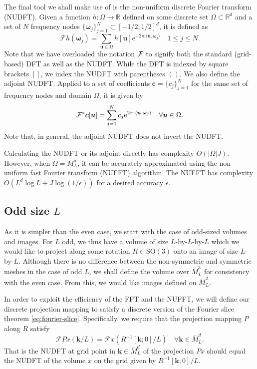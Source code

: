 \documentclass{article}
\newcommand{\euler}{\mathrm{e}}
\newcommand{\imunit}{\mathrm{i}}
\newcommand{\Real}{\mathbb R}
\newcommand{\SO}{\mathrm{SO}}
\newcommand{\meshu}{M}
\newcommand{\meshc}{\overline{M}}
\newcommand{\vol}{x}
\newcommand{\proj}{P}
\newcommand{\vu}{\boldsymbol{u}}
\newcommand{\vomega}{\boldsymbol{\omega}}
\newcommand{\vk}{\boldsymbol{k}}
\newcommand{\vc}{\boldsymbol{c}}
\newcommand{\rot}{R}
\newcommand{\fourier}[1]{\mathcal{F}#1}
\begin{document}
The final tool we shall make use of is the non-uniform discrete Fourier transform (NUDFT).
Given a function $h: \Omega \rightarrow \Real$ defined on some discrete set $\Omega \subset \Real^d$ and a set of $N$ frequency nodes $\{\vomega_j\}_{j=1}^N \subset [-1/2, 1/2]^d$, it is defined as
\begin{equation}
	\fourier{h}(\vomega_j) = \sum_{\vu \in \Omega} h[\vu] \euler^{-2\pi\imunit \langle \vu, \vomega_j \rangle} \quad 1 \le j \le N\mbox{.}
\end{equation}
Note that we have overloaded the notation $\fourier$ to signify both the standard (grid-based) DFT as well as the NUDFT.
While the DFT is indexed by square brackets $[]$, we index the NUDFT with parentheses $()$.
We also define the adjoint NUDFT.
Applied to a set of coefficients $\vc = \{c_j\}_{j=1}^N$ for the same set of frequency nodes and domain $\Omega$, it is given by
\begin{equation}
	\fourier^*{\vc}[\vu] = \sum_{j=1}^N c_j \euler^{2\pi\imunit \langle \vu, \vomega_j \rangle} \quad \forall \vu \in \Omega\mbox{.}
\end{equation}
Note that, in general, the adjoint NUDFT does not invert the NUDFT.

Calculating the NUDFT or its adjoint directly has complexity $O(|\Omega| J)$.
However, when $\Omega = \meshu_L^d$, it can be accurately approximated using the non-uniform fast Fourier transform (NUFFT) algorithm.
The NUFFT has complexity $O(L^d \log L + J \log (1/\epsilon))$ for a desired accuracy $\epsilon$.

\subsection{Odd size $L$}

As it is simpler than the even case, we start with the case of odd-sized volumes and images.
For $L$ odd, we thus have a volume of size $L$-by-$L$-by-$L$ which we would like to project along some rotation $\rot \in \SO(3)$ onto an image of size $L$-by-$L$.
Although there is no difference between the non-symmetric and symmetric meshes in the case of odd $L$, we shall define the volume over $\meshc_L^3$ for consistency with the even case.
From this, we would like images defined on $\meshc_L^2$.

In order to exploit the efficiency of the FFT and the NUFFT, we will define our discrete projection mapping to satisfy a discrete version of the Fourier slice theorem \eqref{eq:fourier-slice}.
Specifically, we require that the projection mapping $\proj$ along $\rot$ satisfy
\begin{equation}
	\fourier{\proj \vol}(\vk/L) = \fourier{\vol}(\rot^{-1} [\vk; 0]/L) \quad \forall \vk \in \meshc_L^d\mbox{.}
\end{equation}
That is the NUDFT at grid point in $\vk \in \meshc_L^d$ of the projection $\proj \vol$ should equal the NUDFT of the volume $\vol$ on the grid given by $\rot^{-1} [\vk; 0]/L$.
\end{document}
